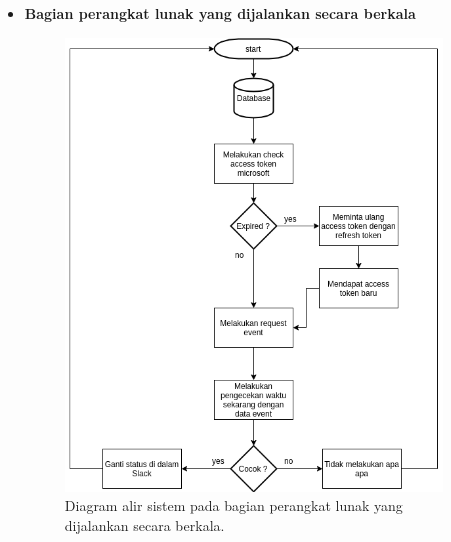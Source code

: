 \begin{itemize}
    \item \textbf{Bagian perangkat lunak yang dijalankan secara berkala}
    \begin{figure}[h]
      \includegraphics[width=10cm]{./Gambar/workflow2.png}
      \centering
      \caption{Diagram alir sistem pada bagian perangkat lunak yang dijalankan secara berkala.}
      \label{fig:workflow2}
    \end{figure}
    

\end{itemize}
